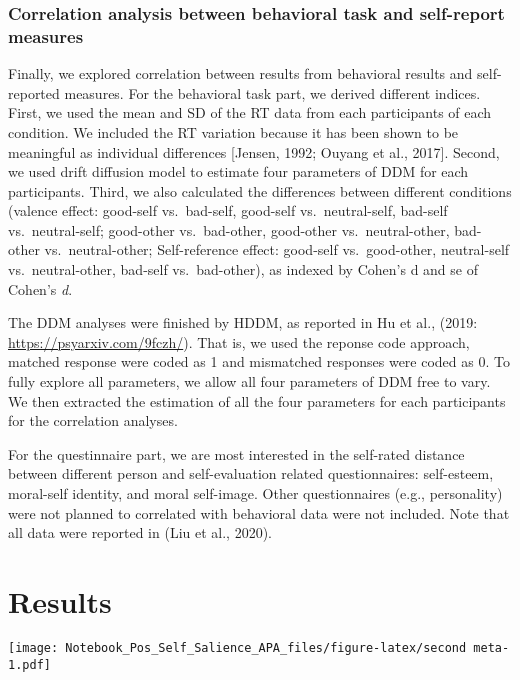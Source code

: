 \documentclass[man]{apa6}
\begin{document}
\hypertarget{correlation-analysis-between-behavioral-task-and-self-report-measures}{%
\subsubsection{Correlation analysis between behavioral task and self-report measures}\label{correlation-analysis-between-behavioral-task-and-self-report-measures}}

Finally, we explored correlation between results from behavioral results and self-reported measures.
For the behavioral task part, we derived different indices. First, we used the mean and SD of the RT data from each participants of each condition. We included the RT variation because it has been shown to be meaningful as individual differences {[}Jensen, 1992; Ouyang et al., 2017{]}. Second, we used drift diffusion model to estimate four parameters of DDM for each participants. Third, we also calculated the differences between different conditions (valence effect: good-self vs.~bad-self, good-self vs.~neutral-self, bad-self vs.~neutral-self; good-other vs.~bad-other, good-other vs.~neutral-other, bad-other vs.~neutral-other; Self-reference effect: good-self vs.~good-other, neutral-self vs.~neutral-other, bad-self vs.~bad-other), as indexed by Cohen's d and se of Cohen's \emph{d}.

The DDM analyses were finished by HDDM, as reported in Hu et al., (2019: \url{https://psyarxiv.com/9fczh/}). That is, we used the reponse code approach, matched response were coded as 1 and mismatched responses were coded as 0. To fully explore all parameters, we allow all four parameters of DDM free to vary. We then extracted the estimation of all the four parameters for each participants for the correlation analyses.

For the questinnaire part, we are most interested in the self-rated distance between different person and self-evaluation related questionnaires: self-esteem, moral-self identity, and moral self-image. Other questionnaires (e.g., personality) were not planned to correlated with behavioral data were not included. Note that all data were reported in (Liu et al., 2020).

\hypertarget{results}{%
\section{Results}\label{results}}

\texttt{[image: Notebook\_Pos\_Self\_Salience\_APA\_files/figure-latex/second meta-1.pdf]}
\end{document}

